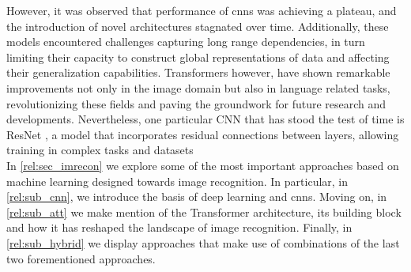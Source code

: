 \noindent However, it was observed that performance of \glspl{cnn} was achieving a plateau, and 
the introduction of novel architectures stagnated over time. Additionally, these models encountered 
challenges capturing long range dependencies, in turn  limiting their capacity to construct global 
representations of data and affecting their generalization capabilities. Transformers however, have 
shown remarkable improvements not only in the image domain but also in language related tasks, 
revolutionizing these fields and paving the groundwork for future research and developments. Nevertheless,
one particular CNN that has stood the test of time is ResNet \autocite{he2016deep}, a model that 
incorporates residual connections between layers, allowing training in complex tasks and datasets\\

\noindent In \autoref{rel:sec_imrecon} we explore some of the most important approaches based 
on machine learning designed towards image recognition. In particular, in \autoref{rel:sub_cnn}, we 
introduce the basis of deep learning and \glspl{cnn}. Moving on, in \autoref{rel:sub_att} we make 
mention of the Transformer architecture, its building block and how it has reshaped the landscape 
of image recognition. Finally, in \autoref{rel:sub_hybrid} we display approaches that make use of 
combinations of the last two forementioned approaches.\\


